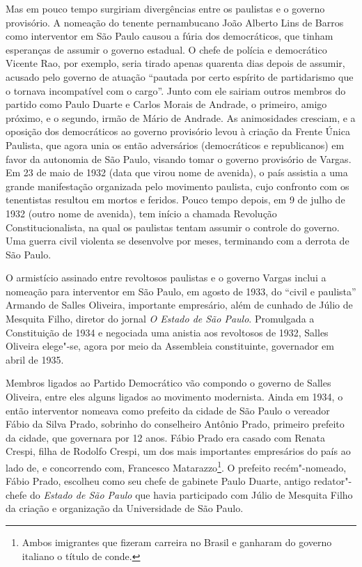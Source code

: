 Mas em pouco tempo surgiriam divergências entre os paulistas e o governo
provisório. A nomeação do tenente pernambucano João Alberto Lins de
Barros como interventor em São Paulo causou a fúria dos democráticos,
que tinham esperanças de assumir o governo estadual. O chefe de polícia
e democrático Vicente Rao, por exemplo, seria tirado apenas quarenta
dias depois de assumir, acusado pelo governo de atuação ``pautada por
certo espírito de partidarismo que o tornava incompatível com o cargo''.
Junto com ele sairiam outros membros do partido como Paulo Duarte e
Carlos Morais de Andrade, o primeiro, amigo próximo, e o segundo, irmão
de Mário de Andrade. As animosidades cresciam, e a oposição dos
democráticos ao governo provisório levou à criação da Frente Única
Paulista, que agora unia os então adversários (democráticos e
republicanos) em favor da autonomia de São Paulo, visando tomar o
governo provisório de Vargas. Em 23 de maio de 1932 (data que virou nome
de avenida), o país assistia a uma grande manifestação organizada pelo
movimento paulista, cujo confronto com os tenentistas resultou em mortos
e feridos. Pouco tempo depois, em 9 de julho de 1932 (outro nome de
avenida), tem início a chamada Revolução Constitucionalista, na qual os
paulistas tentam assumir o controle do governo. Uma guerra civil
violenta se desenvolve por meses, terminando com a derrota de São Paulo.

O armistício assinado entre revoltosos paulistas e o governo Vargas
inclui a nomeação para interventor em São Paulo, em
agosto de 1933, do ``civil e paulista'' Armando de Salles Oliveira,
importante empresário, além de cunhado de Júlio de Mesquita Filho,
diretor do jornal \emph{O Estado de São Paulo}. Promulgada a
Constituição de 1934 e negociada uma anistia aos revoltosos de 1932,
Salles Oliveira elege"-se, agora por meio da Assembleia constituinte,
governador em abril de 1935.

Membros ligados ao Partido Democrático vão compondo o governo de Salles
Oliveira, entre eles alguns ligados ao movimento modernista. Ainda em
1934, o então interventor nomeava como prefeito da cidade de São Paulo o
vereador Fábio da Silva Prado, sobrinho do conselheiro Antônio Prado,
primeiro prefeito da cidade, que governara por 12 anos. Fábio Prado era
casado com Renata Crespi, filha de Rodolfo Crespi, um dos mais
importantes empresários do país ao lado de, e concorrendo com, Francesco
Matarazzo\footnote{Ambos imigrantes que fizeram carreira no Brasil e
  ganharam do governo italiano o título de conde.}. O prefeito
recém"-nomeado, Fábio Prado, escolheu como seu chefe de gabinete Paulo
Duarte, antigo redator"-chefe do \emph{Estado de São Paulo} que havia
participado com Júlio de Mesquita Filho da criação e organização da
Universidade de São Paulo.

